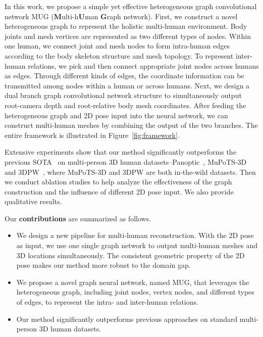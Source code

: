 \documentclass[runningheads]{llncs}
\begin{document}
In this work, we propose a simple yet effective heterogeneous graph convolutional network MUG (\textbf{M}ulti-h\textbf{U}man \textbf{G}raph network). First, we construct a novel heterogeneous graph to represent the holistic multi-human environment. 
Body joints and mesh vertices are represented as two different types of nodes. 
Within one human, we connect joint and mesh nodes to form intra-human edges according to the body skeleton structure and mesh topology. 
To represent inter-human relations, we pick and then connect appropriate joint nodes across humans as edges. 
Through different kinds of edges, the coordinate information can be transmitted among nodes within a human or across humans.
Next, we design a dual branch graph convolutional network structure to simultaneously output root-camera depth and root-relative body mesh coordinates. 
After feeding the heterogeneous graph and 2D pose input into the neural network, we can construct multi-human meshes by combining the output of the two branches. 
The entire framework is illustrated in Figure~\ref{fig:framework}.

Extensive experiments show that our method significantly outperforms the previous SOTA~\cite{jiang2020coherent,zhang2021body,sun2021monocular} on multi-person 3D human datasets--Panoptic~\cite{joo2015panoptic}, MuPoTS-3D~\cite{mehta2018single} and 3DPW~\cite{von2018recovering}, where MuPoTS-3D and 3DPW are both in-the-wild datasets. 
Then we conduct ablation studies to help analyze the effectiveness of the graph construction and the influence of different 2D pose input. 
We also provide qualitative results.

Our {\bf contributions} are summarized as follows.
\begin{itemize}
\itemsep0em 
\item We design a new pipeline for multi-human reconstruction. 
With the 2D pose as input, we use one single graph network to output multi-human meshes and 3D locations simultaneously.
The consistent geometric property of the 2D pose makes our method more robust to the domain gap.
\item We propose a novel graph neural network, named MUG, that leverages the heterogeneous graph, including joint nodes, vertex nodes, and different types of edges, to represent the intra- and inter-human relations.
\item Our method significantly outperforms previous approaches on standard multi-person 3D human datasets.
\end{itemize}
\end{document}
